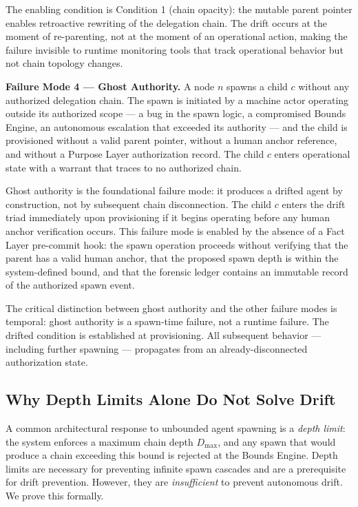 The enabling condition is Condition 1 (chain opacity): the mutable parent pointer enables retroactive rewriting of the delegation chain. The drift occurs at the moment of re-parenting, not at the moment of an operational action, making the failure invisible to runtime monitoring tools that track operational behavior but not chain topology changes.

\medskip
\noindent\textbf{Failure Mode 4 — Ghost Authority.}
A node $n$ spawns a child $c$ without any authorized delegation chain. The spawn is initiated by a machine actor operating outside its authorized scope — a bug in the spawn logic, a compromised Bounds Engine, an autonomous escalation that exceeded its authority — and the child is provisioned without a valid parent pointer, without a human anchor reference, and without a Purpose Layer authorization record. The child $c$ enters operational state with a warrant that traces to no authorized chain.

Ghost authority is the foundational failure mode: it produces a drifted agent by construction, not by subsequent chain disconnection. The child $c$ enters the drift triad immediately upon provisioning if it begins operating before any human anchor verification occurs. This failure mode is enabled by the absence of a Fact Layer pre-commit hook: the spawn operation proceeds without verifying that the parent has a valid human anchor, that the proposed spawn depth is within the system-defined bound, and that the forensic ledger contains an immutable record of the authorized spawn event.

The critical distinction between ghost authority and the other failure modes is temporal: ghost authority is a spawn-time failure, not a runtime failure. The drifted condition is established at provisioning. All subsequent behavior — including further spawning — propagates from an already-disconnected authorization state.

\subsection{Why Depth Limits Alone Do Not Solve Drift}
\label{sec:rs-drift-depth-limits}

A common architectural response to unbounded agent spawning is a \emph{depth limit}: the system enforces a maximum chain depth $D_{\max}$, and any spawn that would produce a chain exceeding this bound is rejected at the Bounds Engine. Depth limits are necessary for preventing infinite spawn cascades and are a prerequisite for drift prevention. However, they are \emph{insufficient} to prevent autonomous drift. We prove this formally.

